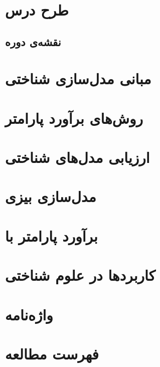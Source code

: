 \documentclass[11pt,a4paper,openany]{book}
\begin{document}
\frontmatter\tableofcontents
\mainmatter
\chapter*{طرح درس}
\begin{landscape}
\chapter*{نقشه‌ی دوره}
\end{landscape}
\chapter{مبانی مدل‌سازی شناختی}


\chapter{روش‌های برآورد پارامتر}



\chapter{ارزیابی مدل‌های شناختی}



\chapter{مدل‌سازی بیزی}


\chapter{برآورد پارامتر با }



\chapter{کاربردها در علوم شناختی}



\chapter*{واژه‌نامه}
\chapter*{فهرست مطالعه}
\end{document}
